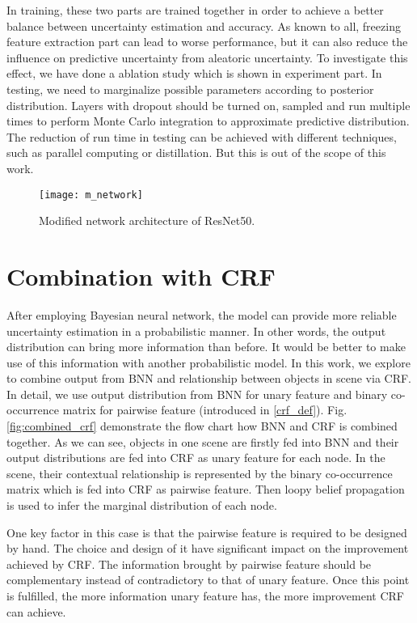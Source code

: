 In training, these two parts are trained together in order to achieve a better balance between uncertainty estimation and accuracy. As known to all, freezing feature extraction part can lead to worse performance, but it can also reduce the influence on predictive uncertainty from aleatoric uncertainty. To investigate this effect, we have done a ablation study which is shown in experiment part. In testing, we need to marginalize possible parameters according to posterior distribution. Layers with dropout should be turned on, sampled and run multiple times to perform Monte Carlo integration to approximate predictive distribution. The reduction of run time in testing can be achieved with different techniques, such as parallel computing or distillation. But this is out of the scope of this work.
\begin{figure}[H]
	\begin{center}
		\texttt{[image: m\_network]}
		\caption{Modified network architecture of ResNet50.}		
		\label{fig:modified_net}
	\end{center}
\end{figure}

\section{Combination with CRF}\label{com_crf}
After employing Bayesian neural network, the model can provide more reliable uncertainty estimation in a probabilistic manner. In other words, the output distribution can bring more information than before. It would be better to make use of this information with another probabilistic model. In this work, we explore to combine output from BNN and relationship between objects in scene via CRF. In detail, we use output distribution from BNN for unary feature and binary co-occurrence matrix for pairwise feature (introduced in \ref{crf_def}). Fig.\ref{fig:combined_crf} demonstrate the flow chart how BNN and CRF is combined together. As we can see, objects in one scene are firstly fed into BNN and their output distributions are fed into CRF as unary feature for each node. In the scene, their contextual relationship is represented by the binary co-occurrence matrix which is fed into CRF as pairwise feature. Then loopy belief propagation is used to infer the marginal distribution of each node. 

One key factor in this case is that the pairwise feature is required to be designed by hand. The choice and design of it have significant impact on the improvement achieved by CRF. The information brought by pairwise feature should be complementary instead of contradictory to that of unary feature. Once this point is fulfilled, the more information unary feature has, the more improvement CRF can achieve.

